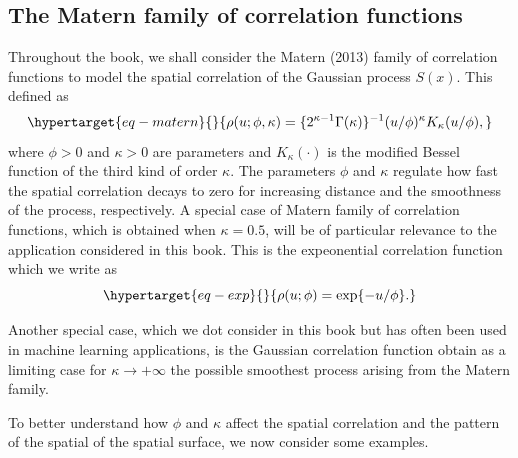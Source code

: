 \documentclass[
  letterpaper,
]{krantz}
\begin{document}
\hypertarget{sec-matern-correlation}{%
\subsection{The Matern family of correlation
functions}\label{sec-matern-correlation}}

Throughout the book, we shall consider the Matern (2013) family of
correlation functions to model the spatial correlation of the Gaussian
process \(S(x)\). This defined as
\begin{equation}\protect\hypertarget{eq-matern}{}{
\rho(u;\phi,\kappa) =\{2^{\kappa-1} \Gamma(\kappa)\}^{-1} (u/\phi)^\kappa K_\kappa(u/\phi),
}\label{eq-matern}\end{equation} where \(\phi>0\) and \(\kappa>0\) are
parameters and \(K_\kappa(\cdot)\) is the modified Bessel function of
the third kind of order \(\kappa\). The parameters \(\phi\) and
\(\kappa\) regulate how fast the spatial correlation decays to zero for
increasing distance and the smoothness of the process, respectively. A
special case of Matern family of correlation functions, which is
obtained when \(\kappa=0.5\), will be of particular relevance to the
application considered in this book. This is the expeonential
correlation function which we write as
\begin{equation}\protect\hypertarget{eq-exp}{}{
\rho(u;\phi) = \exp\{-u/\phi\}.
}\label{eq-exp}\end{equation}

Another special case, which we dot consider in this book but has often
been used in machine learning applications, is the Gaussian correlation
function obtain as a limiting case for \(\kappa \to +\infty\) the
possible smoothest process arising from the Matern family.

To better understand how \(\phi\) and \(\kappa\) affect the spatial
correlation and the pattern of the spatial of the spatial surface, we
now consider some examples.
\end{document}

